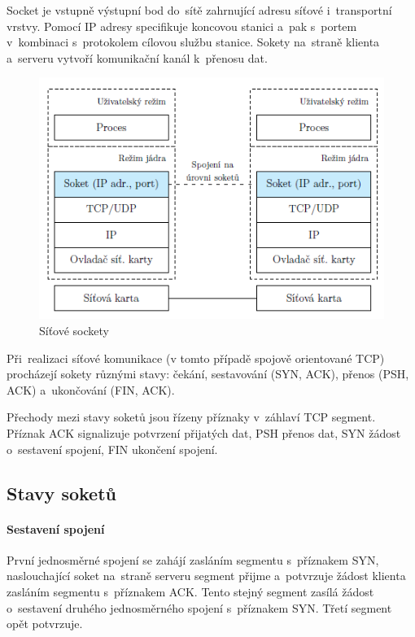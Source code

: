 Socket je vstupně výstupní bod do~sítě zahrnující adresu síťové i~transportní vrstvy. Pomocí IP adresy specifikuje koncovou stanici a~pak s~portem v~kombinaci s~protokolem cílovou službu stanice. Sokety na~straně klienta a~serveru vytvoří komunikační kanál k~přenosu dat.

\begin{figure}[ht]
	\centering
	\includegraphics[scale=1]{images/network_socket.png}
	\caption{Síťové sockety}
	\label{network_socket}
\end{figure}

Při~realizaci síťové komunikace (v tomto případě spojově orientované TCP) procházejí sokety různými stavy: čekání, sestavování (SYN, ACK), přenos (PSH, ACK) a~ukončování (FIN, ACK).

Přechody mezi stavy soketů jsou řízeny příznaky v~záhlaví TCP segment. Příznak ACK signalizuje potvrzení přijatých dat, PSH přenos dat, SYN žádost o~sestavení spojení, FIN ukončení spojení.

\subsection{Stavy soketů}

\paragraph{Sestavení spojení}

První jednosměrné spojení se zahájí zasláním segmentu s~příznakem SYN, naslouchající soket na~straně serveru segment přijme a~potvrzuje žádost klienta zasláním segmentu s~příznakem ACK. Tento stejný segment zasílá žádost o~sestavení druhého jednosměrného spojení s~příznakem SYN. Třetí segment opět potvrzuje.

